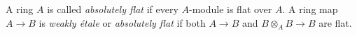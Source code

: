 \begin{definition}
\label{definition-weakly-etale}
A ring $A$ is called {\it absolutely flat} if every $A$-module is flat over
$A$. A ring map $A \to B$ is {\it weakly \'etale} or {\it absolutely flat}
if both $A \to B$ and $B \otimes_A B \to B$ are flat.
\end{definition}